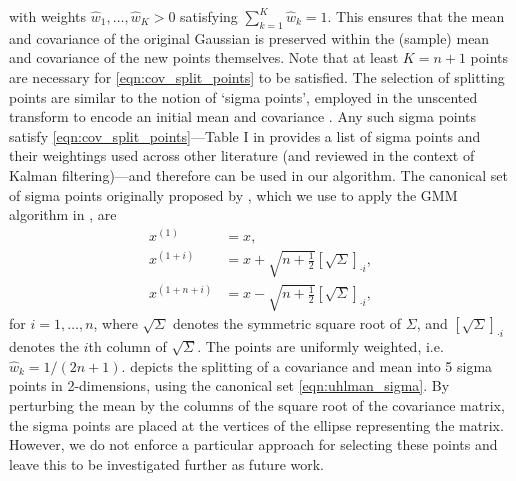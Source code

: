 with weights \(\hat{w}_1,\dotsc,\hat{w}_K > 0\) satisfying \(\sum_{k=1}^{K}{\hat{w}_k} = 1\).
This ensures that the mean and covariance of the original Gaussian is preserved within the (sample) mean and covariance of the new points themselves.
Note that at least \(K = n + 1\) points are necessary for \cref{eqn:cov_split_points} to be satisfied.
The selection of splitting points are similar to the notion of `sigma points', employed in the unscented transform to encode an initial mean and covariance \citep{Uhlmann_1995_DynamicMapBuilding,JulierEtAl_2000_NewMethodNonlinear}.
Any such sigma points satisfy \cref{eqn:cov_split_points}---Table I in \citet{MenegazEtAl_2015_SystematizationUnscentedKalman} provides a list of sigma points and their weightings used across other literature (and reviewed in the context of Kalman filtering)---and therefore can be used in our algorithm.
The canonical set of sigma points originally proposed by \citet{Uhlmann_1995_DynamicMapBuilding}, which we use to apply the GMM algorithm in , are
\begin{subequations}\label{eqn:uhlman_sigma}
	\begin{align}
		x^{(1)}         & = x,                                                          \\
		x^{(1 + i)}     & = x + \sqrt{n + \frac12}\left[\sqrt{\Sigma}\right]_{\cdot i}, \\
		x^{(1 + n + i)} & = x - \sqrt{n + \frac12}\left[\sqrt{\Sigma}\right]_{\cdot i},
	\end{align}
\end{subequations}
for \(i = 1,\dotsc, n\), where \(\sqrt{\Sigma}\) denotes the symmetric square root of \(\Sigma\), and \(\left[\sqrt{\Sigma}\right]_{\cdot i}\) denotes the \(i\)th column of \(\sqrt{\Sigma}\).
The points are uniformly weighted, i.e.\ \(\hat{w}_k = 1 / (2n + 1)\).
 depicts the splitting of a covariance and mean into 5 sigma points in 2-dimensions, using the canonical set \cref{eqn:uhlman_sigma}.
By perturbing the mean by the columns of the square root of the covariance matrix, the sigma points are placed at the vertices of the ellipse representing the matrix.
However, we do not enforce a particular approach for selecting these points and leave this to be investigated further as future work.

